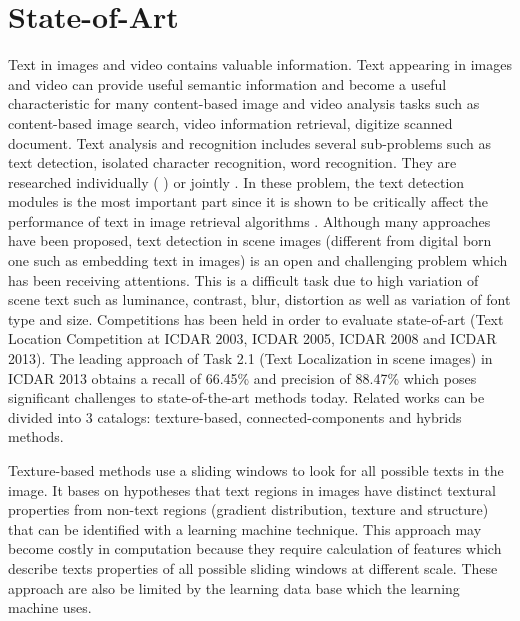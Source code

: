 
\graphicspath{ {1chapterStateOfArt/image/} }
\chapter{State-of-Art} 

\par
Text in images and video contains valuable information. Text appearing in images and video can provide useful semantic information and become a useful characteristic for many content-based image and video analysis tasks such as content-based image search, video information retrieval, digitize scanned document. Text analysis and recognition includes several sub-problems such as text detection, isolated character recognition, word recognition. They are researched individually (\cite{Campos.2010.CVPR} \cite{Chen.2004.CVPR} \cite{Liu.2006.CRA} \cite{Epshtein.2010.CVPR} \cite{xucheng.2013.pami}) or jointly \cite{Neumann12}. In these problem, the text detection modules is the most important part since it is shown to be critically affect the performance of text in image retrieval algorithms \cite{Epshtein.2010.CVPR}. Although many approaches have been proposed, text detection in scene images (different from digital born one such as embedding text in images) is an open and challenging problem which has been receiving attentions. This is a difficult task due to high variation of scene text such as luminance, contrast, blur, distortion as well as variation of font type and size. Competitions has been held in order to evaluate state-of-art (Text Location Competition at ICDAR 2003, ICDAR 2005, ICDAR 2008 and ICDAR 2013). The leading approach of Task 2.1 (Text Localization in scene images) in ICDAR 2013 obtains a recall of 66.45\% and precision of 88.47\% \cite{ICDAR.2013} which poses significant challenges to state-of-the-art methods today. Related works can be divided into 3 catalogs: texture-based, connected-components and hybrids methods. 
\par
Texture-based methods \cite{Chen.2004.CVPR}  use a sliding windows to look for all possible texts in the image. It bases on hypotheses that text regions in images have distinct textural properties from non-text regions (gradient distribution, texture and structure) that can be identified with a learning machine technique. This approach may become costly in computation because they require calculation of features which describe texts properties of all possible sliding windows at different scale. These approach are also be limited by the learning data base which the learning machine uses. 
